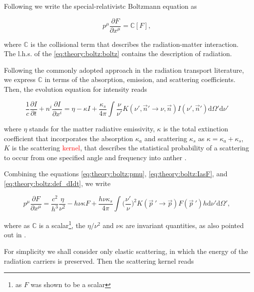 \documentclass[11pt,a4paper,headinclude=true,DIV=14,BCOR=8mm,chapterprefix,listof=totoc,twoside,openright,abstracton]{scrbook}
\begin{document}
Following \cite{Mihalas:1984} we write the special-relativistc Boltzmann equation as

\begin{equation}
    p^{\mu}\frac{\partial F}{\partial x^{\mu}} = \mathbb{C}[F],
    \label{eq:theory:boltz:boltz}
\end{equation}

where $\mathbb{C}$ is the collisional term that describes the radiation-matter interaction. The l.h.s. of the \ref{eq:theory:boltz:boltz} contains the description of radiation. 

Following the commonly adopted approach in the radiation transport literature, we express $\mathbb{C}$ in terms of the absorption, emission, and scattering coefficients. Then, the evolution equation for intensity reads \cite{Pomraning:1973}

\begin{equation}
    \frac{1}{c} \frac{\partial I}{\partial t} + n^i\frac{\partial I}{\partial x^i} = \eta - \kappa I + \frac{\kappa_s}{4\pi}\int\frac{\nu}{\nu'}K(\nu',\vec{n}'\rightarrow\nu,\vec{n}) I(\nu',\vec{n}')\text{d}\Omega'\text{d}\nu'
    \label{eq:theory:boltz:def_dIdt}
\end{equation}

where $\eta$ stands for the matter radiative emissivity, $\kappa$ is the total extinction coefficient that incorporates the absorption $\kappa_a$ and scattering $\kappa_s$ as $\kappa = \kappa_a + \kappa_s$, $K$ is the scattering \textcolor{red}{kernel}, that describes the statistical probability of a scattering to occur from one specified angle and frequency into anther \cite{Pomraning:1973}.

Combining the equations \ref{eq:theory:boltz:pmu}, \ref{eq:theory:boltz:IasF}, and \ref{eq:theory:boltz:def_dIdt}, we write 

\begin{equation}
    p^{\mu}\frac{\partial F}{\partial x^{\mu}} = \frac{c^2}{h^3}\frac{\eta}{\nu^2} - h\nu\kappa F + \frac{h \nu \kappa_s}{4\pi}\int\Bigg(\frac{\nu'}{\nu}\Bigg)^2 K(\vec{p}\:'\rightarrow\vec{p})F(\vec{p}\:')h\text{d}\nu'\text{d}\Omega',
\end{equation}

where as $\mathbb{C}$ is a scalar\footnote{as $F$ was shown to be a scalar}, the $\eta/\nu^2$ and $\nu\kappa$ are invariant quantities, as also pointed out in \cite{Mihalas:1984}. 

For simplicity we shall consider only elastic scattering, in which the energy of the radiation carriers is preserved. Then the scattering kernel reads 
\end{document}
